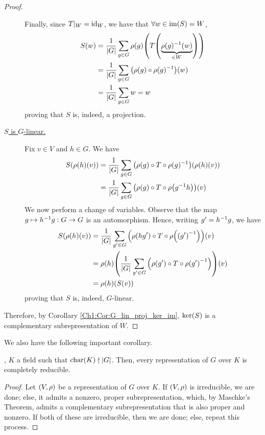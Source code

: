 \begin{proof}
\begin{description}
        Finally, since $T\vert_W = \operatorname{id}_W$, we have that $\forall w \in \operatorname{im}\!\left( S \right) = W$,
        \begin{align*}
            S(w) &= \frac{1}{\left\lvert G \right\rvert} \sum_{g \in G} \rho(g)\!\left( T\!\left( \underbrace{\rho(g)^{-1}(w)}_{\in W} \right) \right) \\
            &= \frac{1}{\left\lvert G \right\rvert} \sum_{g \in G} \left( \rho(g) \circ \rho(g)^{-1} \right)\!(w) \\
            &= \frac{1}{\left\lvert G \right\rvert} \sum_{g \in G} w = w
        \end{align*}
        proving that $S$ is, indeed, a projection.

        \item[\underline{$S$ is $G$-linear.}]
        Fix $v \in V$ and $h \in G$. We have
        \begin{align*}
            S\!\left( \rho(h)(v) \right) &= \frac{1}{\left\lvert G \right\rvert} \sum_{g \in G} \left( \rho(g) \circ T \circ \rho(g)^{-1} \right)\!\left( \rho(h)(v) \right) \\
            &=  \frac{1}{\left\lvert G \right\rvert} \sum_{g \in G} \left( \rho(g) \circ T \circ \rho\!\left( g^{-1} h \right) \right)\!(v)
        \end{align*}
        We now perform a change of variables. Observe that the map $g \mapsto h^{-1} g : G \to G$ is an automorphism. Hence, writing $g' = h^{-1} g$, we have
        \begin{align*}
            \Sof{\rho(h)(v)} &=  \frac{1}{\abs{G}} \sum_{g' \in G} \parenth{\rhoof{hg'} \circ T \circ \rhoof{\parenth{g'}\inv}}\!(v) \\
            &= \rhoof{h}\!\parenth{ \frac{1}{\abs{G}} \sum_{g' \in G} \parenth{\rhoof{g'} \circ T \circ \rhoof{g'}\inv}}\!(v) \\
            &= \rho(h)\!\parenth{\Sof{v}}
        \end{align*}
        proving that $S$ is, indeed, $G$-linear.
    \end{description}
    Therefore, by Corollary \ref{Ch1:Cor:G_lin_proj_ker_im}, $\operatorname{ker}\!\left( S \right)$ is a complementary subrepresentation of $W$.
\end{proof}

We also have the following important corollary.

\begin{corollary} \label{Ch1:Cor:Maschke}
    , $K$ a field such that $\operatorname{char}\!\left( K \right) \nmid \left\lvert G \right\rvert$. Then, every representation of $G$ over $K$ is completely reducible.
\end{corollary}
\begin{proof}
    Let $\left( V, \rho \right)$ be a representation of $G$ over $K$. If $\left( V, \rho \right)$ is irreducible, we are done; else, it admits a nonzero, proper subrepresentation, which, by Maschke's Theorem, admits a complementary subrepresentation that is also proper and nonzero. If both of these are irreducible, then we are done; else, repeat this process.
\end{proof}

